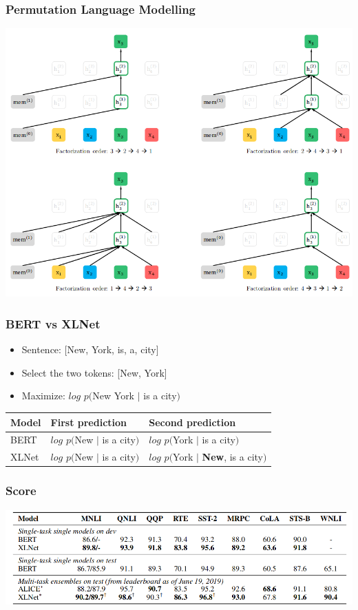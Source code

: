\documentclass{beamer}
\begin{document}
\begin{frame}
    \frametitle{Permutation Language Modelling}
    \begin{center}
        \includegraphics[scale=1.2]{img/XLNet-permutationlm.png}
    \end{center}
\end{frame}

\begin{frame}
    \frametitle{BERT vs XLNet}
    \begin{itemize}
        \item Sentence: [New, York, is, a, city]
        \item Select the two tokens: [New, York]
        \item Maximize: $log$ $p($New York $|$ is a city$)$
    \end{itemize}
    \begin{center}
    	\begin{tabular}{l| l | l}
    	    \textbf{Model} & \textbf{First prediction} & \textbf{Second prediction} \\
    	    \hline
    	    BERT & $log$ $p($New $|$ is a city$)$ & $log$ $p($York $|$ is a city$)$ \\
    	    XLNet & $log$ $p($New $|$ is a city$)$ & $log$ $p($York $|$ \textbf{New}, is a city$)$ \\
    	\end{tabular}
    \end{center}
\end{frame}

\begin{frame}
    \frametitle{Score}
    \begin{center}
        \includegraphics[scale=1.35]{img/XLNet-score.png}
    \end{center}
\end{frame}
\end{document}
